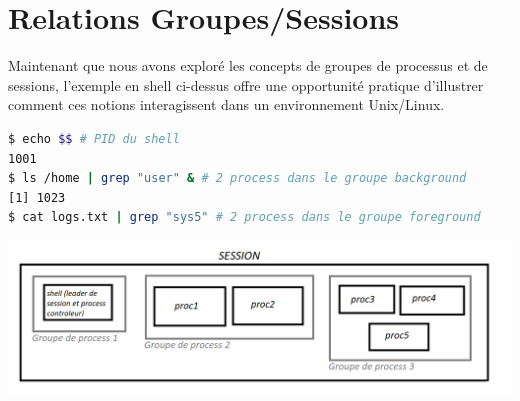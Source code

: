 \section{Relations Groupes/Sessions}

Maintenant que nous avons exploré les concepts de groupes de processus et de sessions, l'exemple en shell ci-dessus offre une opportunité pratique d'illustrer comment ces notions interagissent dans un environnement Unix/Linux.

\begin{lstlisting}[language=sh,basicstyle=\small]
$ echo $$ # PID du shell
1001
$ ls /home | grep "user" & # 2 process dans le groupe background
[1] 1023
$ cat logs.txt | grep "sys5" # 2 process dans le groupe foreground
\end{lstlisting}

\includegraphics[width=1\textwidth]{img/SessionEtGroupes.png}
